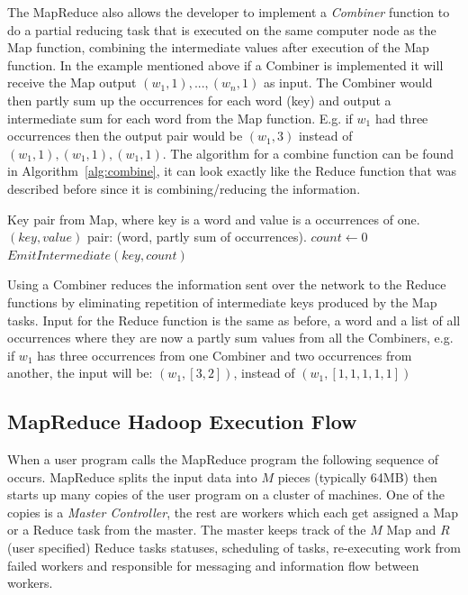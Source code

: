 The MapReduce also allows the developer to implement a \textit{Combiner} function to do a partial reducing task that is executed on the same computer node as the Map function, combining the intermediate values after execution of the Map function. In the example mentioned above if a Combiner is implemented it will receive the Map output $(w_1,1),...,(w_n,1)$ as input. The Combiner would then partly sum up the occurrences for each word (key) and output a intermediate sum for each word from the Map function. E.g. if $w_1$ had three occurrences then the output pair would be $(w_1,3)$ instead of $(w_1,1),(w_1,1),(w_1,1)$. The algorithm for a combine function can be found in Algorithm~\ref{alg:combine}, it can look exactly like the Reduce function that was described before since it is combining/reducing the information.
\begin{center}
\newcommand{\combine}{\ensuremath{\mbox{\sc Combine}}}
\begin{algorithm}[h!]
\caption{$\combine(key,values)$}\label{alg:combine}
\begin{algorithmic}[1]
\REQUIRE Key pair from Map, where key is a word and value is a occurrences of one.
\ENSURE $(key,value)$ pair: (word, partly sum of occurrences).
\STATE $count \leftarrow 0$
\medskip
{} 
\ENDFOR
\STATE $EmitIntermediate(key, count)$
\end{algorithmic}
\end{algorithm}
\end{center}
Using a Combiner reduces the information sent over the network to the Reduce functions by eliminating repetition of intermediate keys produced by the Map tasks. Input for the Reduce function is the same as before, a word and a list of all occurrences where they are now a partly sum values from all the Combiners, e.g. if $w_1$ has three occurrences from one Combiner and two occurrences from another, the input will be: $(w_1, [3,2])$, instead of $(w_1,[1,1,1,1,1])$ 

\subsection{MapReduce Hadoop Execution Flow}
When a user program calls the MapReduce program the following sequence of occurs. MapReduce splits the input data into $M$ pieces (typically 64MB) then starts up many copies of the user program on a cluster of machines. One of the copies is a \textit{Master Controller}, the rest are workers which each get assigned a Map or a Reduce task from the master. The master keeps track of the $M$ Map and $R$ (user specified) Reduce tasks statuses, scheduling of tasks, re-executing work from failed workers and responsible for messaging and information flow between workers.

